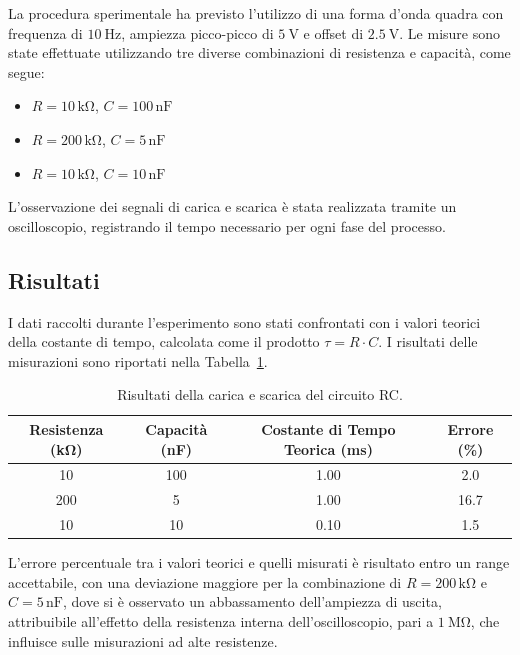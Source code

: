 \documentclass[a4paper,12pt]{article}
\begin{document}
La procedura sperimentale ha previsto l'utilizzo di una forma d'onda quadra con frequenza di \(\SI{10}{\hertz}\), ampiezza picco-picco di \(\SI{5}{\volt}\) e offset di \(\SI{2.5}{\volt}\). Le misure sono state effettuate utilizzando tre diverse combinazioni di resistenza e capacità, come segue:
\begin{itemize}
    \item \( R = 10 \, \mathrm{k\Omega} \), \( C = 100 \, \mathrm{nF} \)
    \item \( R = 200 \, \mathrm{k\Omega} \), \( C = 5 \, \mathrm{nF} \)
    \item \( R = 10 \, \mathrm{k\Omega} \), \( C = 10 \, \mathrm{nF} \)
\end{itemize}
L'osservazione dei segnali di carica e scarica è stata realizzata tramite un oscilloscopio, registrando il tempo necessario per ogni fase del processo.

\subsection{Risultati}
I dati raccolti durante l'esperimento sono stati confrontati con i valori teorici della costante di tempo, calcolata come il prodotto \( \tau = R \cdot C \). I risultati delle misurazioni sono riportati nella Tabella~\ref{tab:rc_charge_discharge}.

\begin{table}[H]
\centering
\begin{tabular}{|c|c|c|c|}
\hline
\textbf{Resistenza (\si{\kilo\ohm})} & \textbf{Capacità (\si{\nano\farad})} & \textbf{Costante di Tempo Teorica (\si{\milli\second})} & \textbf{Errore (\%)} \\ \hline
10 & 100 & 1.00 & 2.0 \\ \hline
200 & 5 & 1.00 & 16.7 \\ \hline
10 & 10 & 0.10 & 1.5 \\ \hline
\end{tabular}
\caption{Risultati della carica e scarica del circuito RC.}
\label{tab:rc_charge_discharge}
\end{table}

L'errore percentuale tra i valori teorici e quelli misurati è risultato entro un range accettabile, con una deviazione maggiore per la combinazione di \( R = 200 \, \mathrm{k\Omega} \) e \( C = 5 \, \mathrm{nF} \), dove si è osservato un abbassamento dell'ampiezza di uscita, attribuibile all'effetto della resistenza interna dell'oscilloscopio, pari a \(\SI{1}{\mega\ohm}\), che influisce sulle misurazioni ad alte resistenze.
\end{document}
